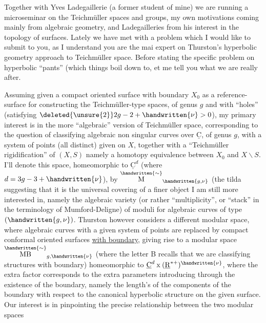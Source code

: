 Together with Yves Ladegaillerie (a former student of mine) we are running a microseminar on the Teichmüller spaces and groups, my own motivations coming mainly from algebraic geometry, and Ladegailleries from his interest in the topology of surfaces. Lately we have met with a problem which I would like to submit to you, as I understand you are the mai expert on Thurston's hyperbolic geometry approach to Teichmüller space. Before stating the specific problem on hyperbolic ``pants'' (which things boil down to\handwritten{)}, et me tell you what we are really after.

Assuming given a compact oriented surface with boundary $X_0$  as a reference-surface for constructing the Teichmüller-type spaces, of genus $g$ and with \quad ``holes'' (satisfying $\deleted{\unsure{2}}2g-2+\handwritten{\nu}>0$), my primary interest is in the more ``algebraic'' version of Teichmüller space, corresponding to the question of classifying algebraic non singular curves over $\underline{\mathrm C}$, of genus $g$, with a system of \quad points (all distinct) given on $X$, together with a ``Teichmüller rigidification'' of $(X,S)$ namely a homotopy equivalence between $X_0$ and $X\backslash S$. I'll denote this space, homeomorphic to $\underline{\mathrm C}^{d}$ (where $d=3g-3+\handwritten{\nu}$), by $\overset{\handwritten{\sim}}{\mathrm M}_{\handwritten{g,\nu}}$ (the tilda suggesting that it is the universal covering of a finer object I am still more interested in, namely the algebraic variety (or rather ``multiplicity'', or ``stack'' in the terminology of Mumford-Deligne) of moduli for algebraic curves of type $(\handwritten{g,\nu})$. Thurston however considers a different modular space, where algebraic curves with a given system of points are replaced by compact conformal oriented surfaces \uline{with boundary}, giving rise to a modular space $\overset{\handwritten{\sim}}{\mathrm{MB}}_{g,\handwritten{\nu}}$ (where the letter B recalls that we are classifying structures with boundary) homeomorphic to $\underline{\mathrm C}^{d}\mathbin{\mathrm x}(\underline{\mathrm R}^{*+})^{\handwritten{\nu}}$, where the extra factor  corresponds to the extra parameters introducing through the existence of the boundary, namely the length's of the  components of the boundary with respect to the canonical hyperbolic structure on the given surface. Our interest is in pinpointing the precise relationship between the two modular spaces

